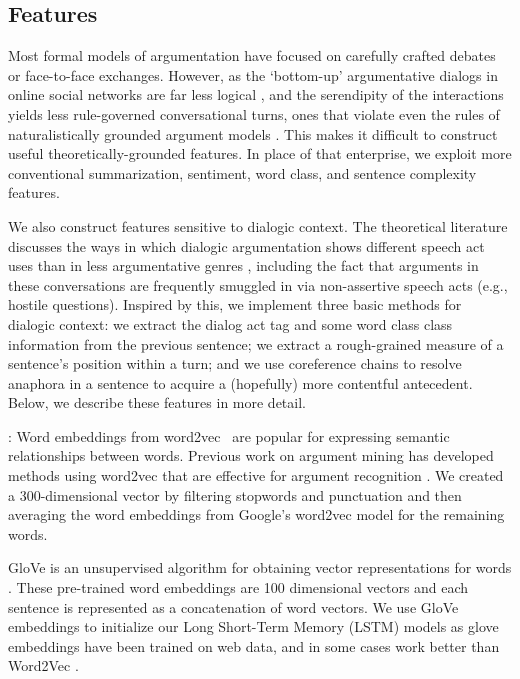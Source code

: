 \documentclass[11pt]{article}
\begin{document}
\subsection{Features}

Most formal models of argumentation have focused on carefully crafted
debates or face-to-face exchanges. However, as the `bottom-up'
argumentative dialogs in online social networks are far less logical
\cite{gabbriellini2013ms,Toni2011bottom}, and the serendipity of the
interactions yields less rule-governed conversational turns, ones that
violate even the rules of naturalistically grounded argument models
\cite{WaltKrab95}. This makes it difficult to construct useful
theoretically-grounded features. In place of that enterprise, we
exploit more conventional summarization, sentiment, word class, and
sentence complexity features.

We also construct features sensitive to dialogic context. The
theoretical literature discusses the ways in which dialogic
argumentation shows different speech act uses than in less
argumentative genres \cite{Budzynska2011speechact,Jacobs1992},
including the fact that arguments in these conversations are
frequently smuggled in via non-assertive speech acts (e.g., hostile
questions). Inspired by this, we implement three basic methods for
dialogic context: we extract the dialog act tag and some word class
class information from the previous sentence; we extract a
rough-grained measure of a sentence's position within a turn; and we
use coreference chains to resolve anaphora in a sentence to acquire a
(hopefully) more contentful antecedent. Below, we describe these
features in more detail.

: Word embeddings from word2vec~\cite{Mikolovetal13} are popular for expressing semantic
relationships between words. Previous work on argument mining has developed methods using word2vec that are effective for argument recognition \cite{Habernalemnlp2015}. We created a 300-dimensional vector by filtering stopwords and punctuation and then averaging the word embeddings from Google's word2vec model for the remaining words.

 GloVe is an unsupervised algorithm
for obtaining vector representations for words
\cite{pennington2014glove}.  These pre-trained word embeddings are 100
dimensional vectors and each sentence is represented as a
concatenation of word vectors. We use GloVe embeddings to initialize
our Long Short-Term Memory (LSTM) models as glove embeddings have been
trained on web data, and in some cases work better than Word2Vec
\cite{stojanovski2016finki}.
\end{document}

